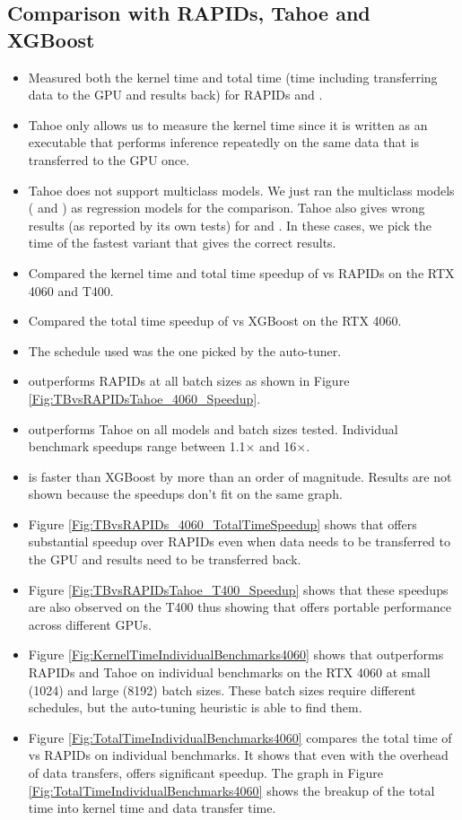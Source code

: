 \subsection{Comparison with RAPIDs, Tahoe and XGBoost}
\begin{itemize}
  \item Measured both the kernel time and total time (time including transferring data to the 
  GPU and results back) for RAPIDs and \Treebeard{}.
  \item Tahoe only allows us to measure the kernel time since it is written as an executable 
  that performs inference repeatedly on the same data that is transferred to the GPU once.
  \item Tahoe does not support multiclass models. We just ran the multiclass models ( and )
  as regression models for the comparison. Tahoe also gives wrong results (as reported by its own tests) for 
   and . In these cases, we pick the time of the fastest variant that gives the correct results.
  \item Compared the kernel time and total time speedup of \Treebeard{} vs RAPIDs on the RTX 4060 and T400.
  \item Compared the total time speedup of \Treebeard{} vs XGBoost on the RTX 4060.
  \item The schedule used was the one picked by the auto-tuner.
  \item \Treebeard{} outperforms RAPIDs at all batch sizes as shown in Figure \ref{Fig:TBvsRAPIDsTahoe_4060_Speedup}. 
  \item \Treebeard{} outperforms Tahoe on all models and batch sizes tested. Individual benchmark speedups range between 1.1$\times$ and 16$\times$.
  \item \Treebeard{} is faster than XGBoost by more than an order of magnitude. Results are not shown because the speedups don't fit on the same graph.
  \item Figure \ref{Fig:TBvsRAPIDs_4060_TotalTimeSpeedup} shows that \Treebeard{} offers substantial speedup over RAPIDs even when 
  data needs to be transferred to the GPU and results need to be transferred back.
  \item Figure \ref{Fig:TBvsRAPIDsTahoe_T400_Speedup} shows that these speedups are also observed on the T400 thus showing 
  that \Treebeard{} offers portable performance across different GPUs.
  \item Figure \ref{Fig:KernelTimeIndividualBenchmarks4060} shows that \Treebeard{} outperforms RAPIDs and Tahoe on 
  individual benchmarks on the RTX 4060 at small (1024) and large (8192) batch sizes. These batch sizes 
  require different schedules, but the \Treebeard{} auto-tuning heuristic is able to find them.
  \item Figure \ref{Fig:TotalTimeIndividualBenchmarks4060} compares the total time of \Treebeard{} vs RAPIDs on individual benchmarks. 
  It shows that even with the overhead of data transfers, \Treebeard{} offers significant speedup. The graph in Figure \ref{Fig:TotalTimeIndividualBenchmarks4060} 
  shows the breakup of the total time into kernel time and data transfer time.
\end{itemize}

